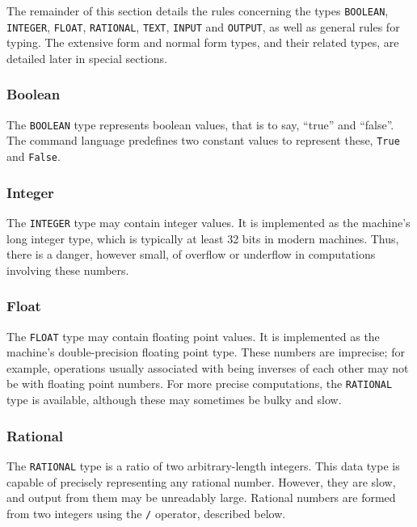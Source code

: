 \medskip

The remainder of this section details the rules concerning the types
{\tt BOOLEAN}, {\tt INTEGER}, {\tt FLOAT}, {\tt RATIONAL}, {\tt TEXT},
{\tt INPUT} and {\tt OUTPUT}, as well as general rules for typing.
The extensive form and normal form types, and their related types, are
detailed later in special sections.

\subsubsection{Boolean}

The {\tt BOOLEAN} type represents boolean values, that is to say,
``true'' and ``false''.  The command language predefines two constant
values to represent these, {\tt True} and {\tt False}.

\subsubsection{Integer}

The {\tt INTEGER} type may contain integer values.  It is implemented
as the machine's long integer type, which is typically at least 32
bits in modern machines.  Thus, there is a danger, however small, of
overflow or underflow in computations involving these numbers.

\subsubsection{Float}

The {\tt FLOAT} type may contain floating point values.  It is
implemented as the machine's double-precision floating point type.
These numbers are imprecise; for example, operations usually
associated with being inverses of each other may not be with floating
point numbers.  For more precise computations, the {\tt RATIONAL} type
is available, although these may sometimes be bulky and slow.

\subsubsection{Rational}

The {\tt RATIONAL} type is a ratio of two arbitrary-length integers.
This data type is capable of precisely representing any rational
number.  However, they are slow, and output from them may be
unreadably large.  Rational numbers are formed from two integers using
the {\tt /} operator, described below.

